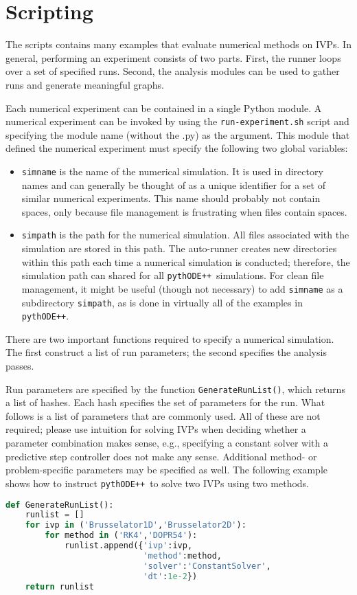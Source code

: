 \documentclass[11pt]{article}
\newcommand{\pypp}{\texttt{pythODE++}}
\begin{document}
\section{Scripting}

The scripts contains many examples that evaluate numerical methods on IVPs. In general, performing an experiment consists of two parts. First, the runner loops over a set of specified runs. Second, 
the analysis modules can be used to gather runs and generate meaningful graphs.

Each numerical experiment can be contained in a single Python module. A numerical experiment can be invoked by using the \verb=run-experiment.sh= script and specifying the module name (without the .py) as the argument. This module that defined the numerical experiment must specify the following two global variables:
\begin{itemize}
\item \verb=simname= is the name of the numerical simulation. It is used in directory names and can generally be thought of as a unique identifier for a set of similar numerical experiments. This name should probably not contain spaces, only because file management is frustrating when files contain spaces. 
\item \verb=simpath= is the path for the numerical simulation. All files associated with the simulation are stored in this path. The auto-runner creates new directories within this path each time a numerical simulation is conducted; therefore, the simulation path can shared for all \pypp\ simulations. For clean file management, it might be useful (though not necessary) to add \verb=simname= as a subdirectory \verb=simpath=, as is done in virtually all of the examples in \pypp.
\end{itemize}

There are two important functions required to specify a numerical simulation. The first construct a list of run parameters; the second specifies the analysis passes.

Run parameters are specified by the function \verb=GenerateRunList()=, which returns a list of hashes. Each hash specifies the set of parameters for the run. What follows is a list of parameters that are commonly used. All of these are not required; please use intuition for solving IVPs when deciding whether a parameter combination makes sense, e.g., specifying a constant solver with a predictive step controller does not make any sense. Additional method- or problem-specific parameters may be specified as well. The following example shows how to instruct \pypp\ to solve two IVPs using two methods.
\begin{lstlisting}[tabsize=4,language=Python]
def GenerateRunList():
	runlist = []
	for ivp in ('Brusselator1D','Brusselator2D'):
		for method in ('RK4','DOPR54'):
			runlist.append({'ivp':ivp,
							'method':method,
							'solver':'ConstantSolver',
							'dt':1e-2})
	return runlist
\end{lstlisting}
\end{document}
